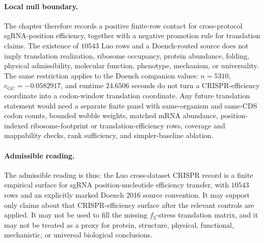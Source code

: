\paragraph{Local null boundary.}
The chapter therefore records a positive finite-row contact for cross-protocol sgRNA-position efficiency, together with a negative promotion rule for translation claims.  The existence of $10543$ Luo rows and a Doench-routed source does not imply translation realization, ribosome occupancy, protein abundance, folding, physical admissibility, molecular function, phenotype, mechanism, or universality.  The same restriction applies to the Doench companion values: $n=5310$, $r_{\mathrm{GC}}=-0.0582917$, and runtime $24.6506$ seconds do not turn a CRISPR-efficiency coordinate into a codon-window translation coordinate.  Any future translation statement would need a separate finite panel with same-organism and same-CDS codon counts, bounded wobble weights, matched mRNA abundance, position-indexed ribosome-footprint or translation-efficiency rows, coverage and mappability checks, rank sufficiency, and simpler-baseline ablation.

\paragraph{Admissible reading.}
The admissible reading is thus: the Luo cross-dataset CRISPR record is a finite empirical surface for sgRNA position-nucleotide efficiency transfer, with $10543$ rows and an explicitly marked Doench 2016 source convention.  It may support only claims about that CRISPR-efficiency surface after the relevant controls are applied.  It may not be used to fill the missing $f_3$-stress translation matrix, and it may not be treated as a proxy for protein, structure, physical, functional, mechanistic, or universal biological conclusions.